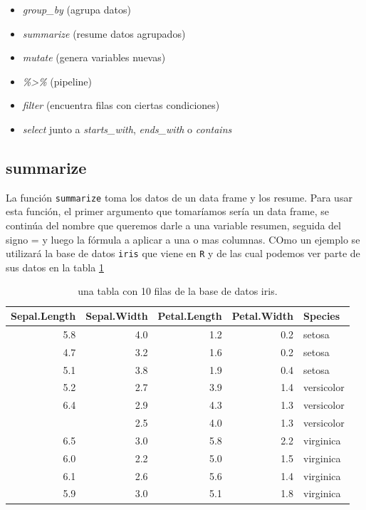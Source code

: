 \documentclass[]{book}
\providecommand{\tightlist}{%
  \setlength{\itemsep}{0pt}\setlength{\parskip}{0pt}}
\begin{document}
\begin{itemize}
\tightlist
\item
  \emph{group\_by} (agrupa datos)
\item
  \emph{summarize} (resume datos agrupados)
\item
  \emph{mutate} (genera variables nuevas)
\item
  \emph{\%\textgreater{}\%} (pipeline)
\item
  \emph{filter} (encuentra filas con ciertas condiciones)
\item
  \emph{select} junto a \emph{starts\_with}, \emph{ends\_with} o
  \emph{contains}
\end{itemize}

\hypertarget{summarize}{%
\subsection{summarize}\label{summarize}}

La función \texttt{summarize} toma los datos de un data frame y los
resume. Para usar esta función, el primer argumento que tomaríamos sería
un data frame, se continúa del nombre que queremos darle a una variable
resumen, seguida del signo = y luego la fórmula a aplicar a una o mas
columnas. COmo un ejemplo se utilizará la base de datos \texttt{iris}
\citep{anderson1935irises} que viene en \texttt{R} y de las cual podemos
ver parte de sus datos en la tabla \ref{tab:iris}

\begin{table}

\caption{\label{tab:iris}una tabla con 10 filas de la base de datos iris.}
\centering
\begin{tabular}[t]{rrrrl}
\toprule
Sepal.Length & Sepal.Width & Petal.Length & Petal.Width & Species\\
\midrule
5.8 & 4.0 & 1.2 & 0.2 & setosa\\
4.7 & 3.2 & 1.6 & 0.2 & setosa\\
5.1 & 3.8 & 1.9 & 0.4 & setosa\\
5.2 & 2.7 & 3.9 & 1.4 & versicolor\\
6.4 & 2.9 & 4.3 & 1.3 & versicolor\\
\addlinespace
5.5 & 2.5 & 4.0 & 1.3 & versicolor\\
6.5 & 3.0 & 5.8 & 2.2 & virginica\\
6.0 & 2.2 & 5.0 & 1.5 & virginica\\
6.1 & 2.6 & 5.6 & 1.4 & virginica\\
5.9 & 3.0 & 5.1 & 1.8 & virginica\\
\bottomrule
\end{tabular}
\end{table}
\end{document}
